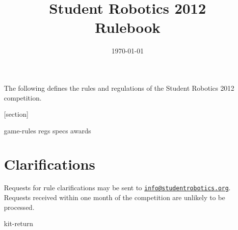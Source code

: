 \documentclass[a4paper, 12pt]{scrartcl}
\title {Student Robotics 2012\\ Rulebook}
\date{\today}
\begin{document}
\maketitle

\noindent The following defines the rules and regulations of the Student Robotics 2012 competition.

[section]
\newcommand{\rcn}{\stepcounter{rule}\arabic{section}.\arabic{rule}}
\renewcommand{\labelenumi}{\rcn}

 {game-rules}
\newpage
 {regs}
\newpage
 {specs}
\newpage
 {awards}

\renewcommand{\labelenumi}{\rcn}

\section{Clarifications}
Requests for rule clarifications may be sent to \href{mailto:info@studentrobotics.org}{\nolinkurl{info@studentrobotics.org}}.  Requests received within one month of the competition are unlikely to be processed.


\newpage
\appendix
\appendixpage
\addappheadtotoc
 {kit-return}
\end{document}

